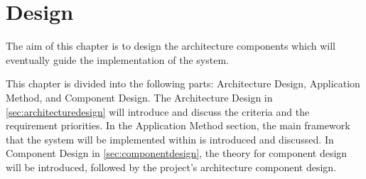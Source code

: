 \documentclass[../../master.tex]{subfiles}
\begin{document}
\chapter{Design}\label{ch:design}
The aim of this chapter is to design the architecture components which will eventually guide the implementation of the system.

This chapter is divided into the following parts: Architecture Design, Application Method, and Component Design.
The Architecture Design in \cref{sec:architecturedesign} will introduce and discuss the criteria and the requirement priorities.
In the Application Method section, the main framework that the system will be implemented within is introduced and discussed.
In Component Design in \cref{sec:componentdesign}, the theory for component design will be introduced, followed by the project's architecture component design.





\end{document}
